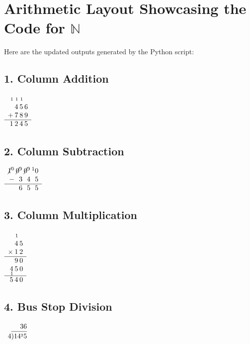 \documentclass[11pt]{article}
\begin{document}
	
	\section*{Arithmetic Layout Showcasing the Code for $\mathbb{N}$}
	\noindent Here are the updated outputs generated by the Python script:
	
	\subsection*{1. Column Addition}
	\begin{center}
		{\large
			$\begin{array}{r@{\hspace{2pt}}r@{\hspace{2pt}}r@{\hspace{2pt}}r}
				\scriptstyle{1} & \scriptstyle{1} & \scriptstyle{1} &  \\
				& 4 & 5 & 6 \\
				+ & 7 & 8 & 9 \\
				\hline
				1 & 2 & 4 & 5
			\end{array}$
		}
	\end{center}
	
	\subsection*{2. Column Subtraction}
	\begin{center}
		{\large
			$\begin{array}{r@{\hspace{2pt}}r@{\hspace{2pt}}r@{\hspace{2pt}}r}
				\cancel{1}^{0} & \cancel{0}^{9} & \cancel{0}^{9} & ^{1}0 \\
				- & 3 & 4 & 5 \\
				\hline
				& 6 & 5 & 5
			\end{array}$
		}
	\end{center}
	
	\subsection*{3. Column Multiplication}
	\begin{center}
		{\large
			$\begin{array}{r@{\hspace{2pt}}r@{\hspace{2pt}}r}
				& \scriptstyle{1} &  \\
				& 4 & 5 \\
				\times & 1 & 2 \\
				\hline
				& 9 & 0 \\
				4 & 5 & 0 \\[-0.6em]
				\scriptstyle{1} &  &  \\[-0.3em]
				\hline
				5 & 4 & 0
			\end{array}$
		}
	\end{center}
	
	\subsection*{4. Bus Stop Division}
	\begin{center}
		{\large
			$\begin{array}{r}
				36 \\
				4 \overline{\smash{)}\strut 14^{\scriptscriptstyle{2}}5}
			\end{array}$
		}
	\end{center}
	
\end{document}
